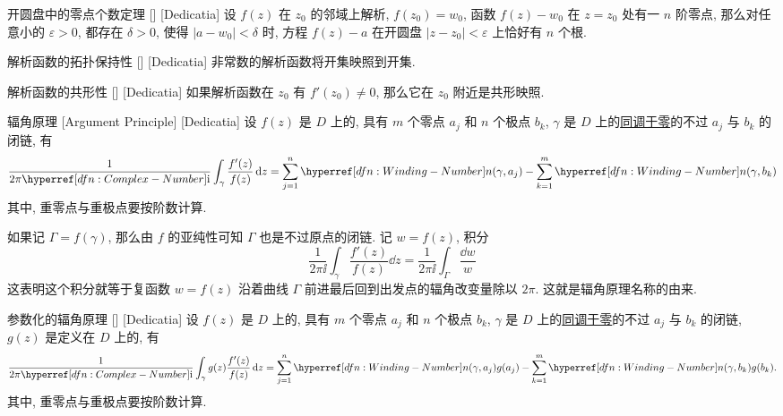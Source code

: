         \begin{thm}
            {开圆盘中的零点个数定理}
            []
            [Dedicatia]
            设 \(f(z)\) 在 \(z_0\) 的邻域上解析,  \(f(z_0)=w_0\), 函数 \(f(z)-w_0\) 在 \(z=z_0\) 处有一 \(n\) 阶零点, 那么对任意小的 \(\varepsilon>0\), 都存在 \(\delta>0\), 使得 \(|a-w_0|<\delta\) 时, 方程 \(f(z)-a\) 在开圆盘 \(|z-z_0|<\varepsilon\) 上恰好有 \(n\) 个根. 
        \end{thm}
        
        \begin{crl}
            {解析函数的拓扑保持性}
            []
            [Dedicatia]
            非常数的解析函数将开集映照到开集. 
        \end{crl}

        \begin{crl}
            {解析函数的共形性}
            []
            [Dedicatia]
            如果解析函数在 \(z_0\) 有 \(f'(z_0)\neq 0\), 那么它在 \(z_0\) 附近是共形映照. 
        \end{crl}

        \begin{crl}
            {辐角原理}
            [Argument Principle]
            [Dedicatia]
            设 \(f(z)\) 是 \(D\) 上的\Meromorphic{}, 具有 \(m\) 个零点 \(a_j\) 和 \(n\) 个极点 \(b_k\),  \(\gamma\) 是 \(D\) 上的\hyperref[dfn:Null-Homologous]{同调于零}的不过 \(a_j\) 与 \(b_k\) 的闭链, 有
            \[\frac{1}{2\pi\ii}\int_\gamma\frac{f'(z)}{f(z)}\dd{z}=\sum_{j = 1}^{n} \Windn(\gamma,a_j)-\sum_{k = 1}^{m} \Windn(\gamma,b_k)  \]
            其中, 重零点与重极点要按阶数计算. 
        \end{crl}

        \begin{rmk}
            [Dedicatia]
            如果记 \(\Gamma=f(\gamma)\), 那么由 \(f\) 的亚纯性可知 \(\Gamma\) 也是不过原点的闭链. 记 \(w=f(z)\), 积分
            \[\frac{1}{2\pi\ii}\int_{\gamma}\frac{f'(z)}{f(z)}\dd{z}=\frac{1}{2\pi\ii}\int_{\Gamma}\frac{\dd w}{w}\]
            这表明这个积分就等于复函数 \(w=f(z)\) 沿着曲线 \(\Gamma\) 前进最后回到出发点的辐角改变量除以 \(2\pi\). 这就是辐角原理名称的由来.
        \end{rmk}

        \begin{crl}
            {参数化的辐角原理}
            []
            [Dedicatia]
            设 \(f(z)\) 是 \(D\) 上的\Meromorphic{}, 具有 \(m\) 个零点 \(a_j\) 和 \(n\) 个极点 \(b_k\),  \(\gamma\) 是 \(D\) 上的\hyperref[dfn:Null-Homologous]{同调于零}的不过 \(a_j\) 与 \(b_k\) 的闭链,  \(g(z)\) 是定义在 \(D\) 上的\Analytic{}, 有
            \[\frac{1}{2\pi\ii}\int_\gamma g(z)\frac{f'(z)}{f(z)}\dd{z}=\sum_{j = 1}^{n} \Windn(\gamma,a_j)g(a_j)-\sum_{k = 1}^{m} \Windn(\gamma,b_k)g(b_k).  \]
            其中, 重零点与重极点要按阶数计算. 
        \end{crl}

